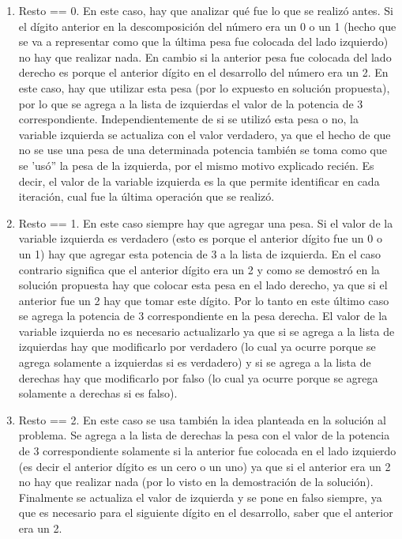 	\begin{enumerate}
		\item{
			Resto == 0. En este caso, hay que analizar qué fue lo que se realizó antes. Si el dígito anterior en la descomposición del número era un 0 o un 1 (hecho que se va a representar como que la última pesa fue colocada del lado izquierdo) no hay que realizar nada. En cambio si la anterior pesa fue colocada del lado derecho es porque el anterior dígito en el desarrollo del número era un 2. En este caso, hay que utilizar esta pesa (por lo expuesto en solución propuesta), por lo que se agrega a la lista de izquierdas el valor de la potencia de 3 correspondiente. Independientemente de si se utilizó esta pesa o no, la variable izquierda se actualiza con el valor verdadero, ya que el hecho de que no se use una pesa de una determinada potencia también se toma como que se 'usó'' la pesa de la izquierda, por el mismo motivo explicado recién. Es decir, el valor de la variable izquierda es la que permite identificar en cada iteración, cual fue la última operación que se realizó. 
		}
		\item{
			Resto == 1. En este caso siempre hay que agregar una pesa. Si el valor de la variable izquierda es verdadero (esto es porque el anterior dígito fue un 0 o un 1) hay que agregar esta potencia de 3 a la lista de izquierda. En el caso contrario significa que el anterior dígito era un 2 y como se demostró en la solución propuesta hay que colocar esta pesa en el lado derecho, ya que si el anterior fue un 2 hay que tomar este dígito. Por lo tanto en este último caso se agrega la potencia de 3 correspondiente en la pesa derecha. El valor de la variable izquierda no es necesario actualizarlo ya que si se agrega a la lista de izquierdas hay que modificarlo por verdadero (lo cual ya ocurre porque se agrega solamente a izquierdas si es verdadero) y si se agrega a la lista de derechas hay que modificarlo por falso (lo cual ya ocurre porque se agrega solamente a derechas si es falso).
		}
		\item{
			Resto == 2. En este caso se usa también la idea planteada en la solución al problema. Se agrega a la lista de derechas la pesa con el valor de la potencia de 3 correspondiente solamente si la anterior fue colocada en el lado izquierdo (es decir el anterior dígito es un cero o un uno) ya que si el anterior era un 2 no hay que realizar nada (por lo visto en la demostración de la solución). Finalmente se actualiza el valor de izquierda y se pone en falso siempre, ya que es necesario para el siguiente dígito en el desarrollo, saber que el anterior era un 2.	
		}
	\end{enumerate}

